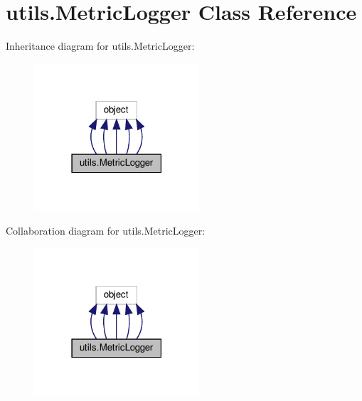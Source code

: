\hypertarget{classutils_1_1MetricLogger}{}\section{utils.\+Metric\+Logger Class Reference}
\label{classutils_1_1MetricLogger}


Inheritance diagram for utils.\+Metric\+Logger\+:
\nopagebreak
\begin{figure}[H]
\begin{center}
\leavevmode
\includegraphics[width=174pt]{classutils_1_1MetricLogger__inherit__graph}
\end{center}
\end{figure}


Collaboration diagram for utils.\+Metric\+Logger\+:
\nopagebreak
\begin{figure}[H]
\begin{center}
\leavevmode
\includegraphics[width=174pt]{classutils_1_1MetricLogger__coll__graph}
\end{center}
\end{figure}
